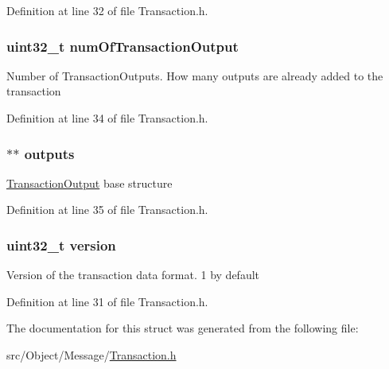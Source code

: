 Definition at line 32 of file Transaction.h.

\hypertarget{struct_transaction_aeeae027bddb846b239fd05e203c0c62a}{
\subsubsection[{numOfTransactionOutput}]{\setlength{\rightskip}{0pt plus 5cm}uint32\_\-t {\bf numOfTransactionOutput}}}
\label{struct_transaction_aeeae027bddb846b239fd05e203c0c62a}
Number of TransactionOutputs. How many outputs are already added to the transaction 

Definition at line 34 of file Transaction.h.

\hypertarget{struct_transaction_a0f4d7ecc12680c61da7267851e819cf0}{
\subsubsection[{outputs}]{$\ast$$\ast$ {\bf outputs}}}
\label{struct_transaction_a0f4d7ecc12680c61da7267851e819cf0}
\hyperlink{struct_transaction_output}{TransactionOutput} base structure 

Definition at line 35 of file Transaction.h.

\hypertarget{struct_transaction_acd99bb05ca015e7d74448acb1deba7ca}{
\subsubsection[{version}]{\setlength{\rightskip}{0pt plus 5cm}uint32\_\-t {\bf version}}}
\label{struct_transaction_acd99bb05ca015e7d74448acb1deba7ca}
Version of the transaction data format. 1 by default 

Definition at line 31 of file Transaction.h.



The documentation for this struct was generated from the following file:\begin{DoxyCompactItemize}
\item 
src/Object/Message/\hyperlink{_transaction_8h}{Transaction.h}\end{DoxyCompactItemize}
